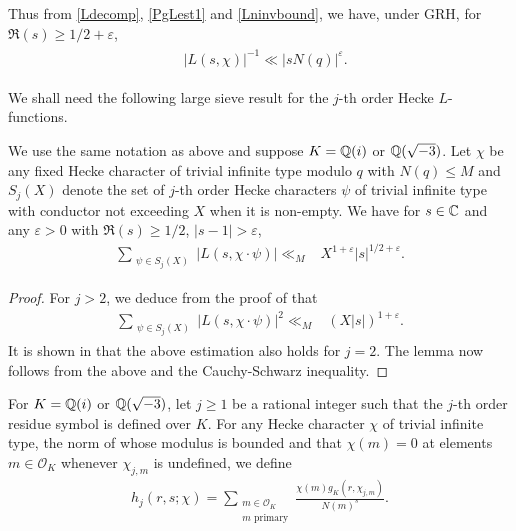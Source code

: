 \documentclass[twoside,leqno,10pt, A4]{amsart}
\begin{document}
Thus from \eqref{Ldecomp}, \eqref{PgLest1} and \eqref{Lninvbound}, we have, under GRH, for $\Re(s) \geq 1/2+\varepsilon$,
\begin{align}
\label{PgLest2}
\begin{split}
& \big| L( s,  \chi ) \big |^{-1} \ll |sN(q)|^{\varepsilon}.
\end{split}
\end{align}

We shall need the following large sieve result for the $j$-th order Hecke $L$-functions.
\begin{lemma} \label{lem:2.3}
We use the same notation as above and suppose $K=\mathbb Q(i)$ or $\mathbb Q(\sqrt{-3})$. Let $\chi$ be any fixed Hecke character of trivial infinite type modulo $q$ with $N(q) \leq M$ and $S_j(X)$ denote the set of $j$-th order Hecke characters $\psi$ of trivial infinite type with
conductor not exceeding $X$ when it is non-empty.  We have for $s\in \mathbb{C}$ and any $\varepsilon>0$ with $\Re(s) \geq 1/2$, $|s-1|>\varepsilon$,
\begin{align}
\label{L1estimation}
\sum_{\substack{\psi \in S_j(X)}} |L(s, \chi \cdot \psi)|
\ll_M & X^{1+\varepsilon} |s|^{1/2+\varepsilon}.
\end{align}
\end{lemma}
\begin{proof}
  For $j>2$, we deduce from the proof of \cite[Corollary 1.4]{BGL} that
\begin{align*}
\sum_{\substack{\psi \in S_j(X)}} |L(s, \chi \cdot \psi)|^2
\ll_M & (X|s|)^{1+\varepsilon}.
\end{align*}
 It is shown in \cite[(4.1)]{G&Zhao3} that the above estimation also holds for $j=2$. The lemma now follows from the above and the Cauchy-Schwarz inequality.
\end{proof}

   For $K=\mathbb Q(i)$ or $\mathbb Q(\sqrt{-3})$, let $j \geq 1$ be a rational integer such that the $j$-th order residue symbol is defined over $K$.
For any Hecke character $\chi$ of trivial infinite type, the norm of whose modulus is bounded and that $\chi(m) = 0$ at elements $m \in
\mathcal O_K$ whenever $\chi_{j,m}$ is undefined, we define
\begin{align} \label{h}
   h_j(r,s;\chi)=\sum_{\substack{ m \in \mathcal O_K \\ m \text{ primary} }}\frac {\chi(m)g_{K}(r,\chi_{j,m})}{N(m)^s}.
\end{align}
\end{document}
